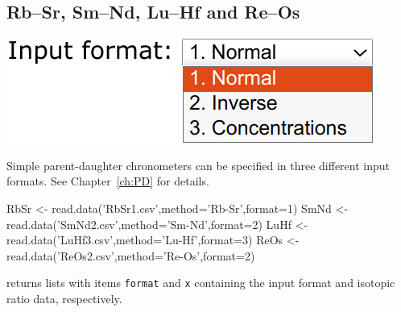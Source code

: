 \begin{refsection}

\chapter{Rb--Sr, Sm--Nd, Lu--Hf and Re--Os}\label{ch:PD-R}

\noindent\begin{minipage}[t]{.3\linewidth}
\strut\vspace*{-\baselineskip}\newline
\includegraphics[width=\linewidth]{../figures/PDformats.png}
\end{minipage}
\begin{minipage}[t]{.7\textwidth}
  Simple parent-daughter chronometers can be specified in three
  different input formats. See Chapter~\ref{ch:PD} for details.
\end{minipage}

\begin{script}
RbSr <- read.data('RbSr1.csv',method='Rb-Sr',format=1)
SmNd <- read.data('SmNd2.csv',method='Sm-Nd',format=2)
LuHf <- read.data('LuHf3.csv',method='Lu-Hf',format=3)
ReOs <- read.data('ReOs2.csv',method='Re-Os',format=2)
\end{script}

\noindent returns lists with items \texttt{format} and \texttt{x}
containing the input format and isotopic ratio data, respectively.\\


\end{refsection}
